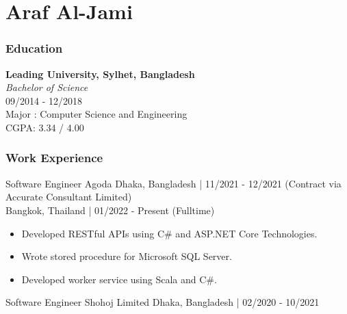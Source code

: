 \documentclass{resumestyle}
\begin{document}
\large%

\part{Araf Al-Jami}

\section{Education}%

\textbf{Leading University, Sylhet, Bangladesh}\\%
\textit{Bachelor of Science}\\%
{09/2014 - 12/2018}\\%
Major : Computer Science and Engineering\\%
CGPA: 3.34 / 4.00%

\section{Work Experience}%
    \worksubsection%
        {Software Engineer}%
        {Agoda}%
        {Dhaka, Bangladesh | 11/2021 - 12/2021 (Contract via Accurate Consultant Limited)}\\%
        {Bangkok, Thailand | 01/2022 - Present (Fulltime)}%
    
    \begin{itemize}[labelsep=4pt,leftmargin=*,topsep=5pt,partopsep=0pt,itemsep=1pt]%
        \item Developed RESTful APIs using C\# and ASP.NET Core Technologies.%
        \item Wrote stored procedure for Microsoft SQL Server.%
        \item Developed worker service using Scala and C\#.%
    \end{itemize}%

    \vspace{4pt}%

    \worksubsection%
        {Software Engineer}%
        {Shohoj Limited}%
        {Dhaka, Bangladesh | 02/2020 - 10/2021}%
    
\end{document}
